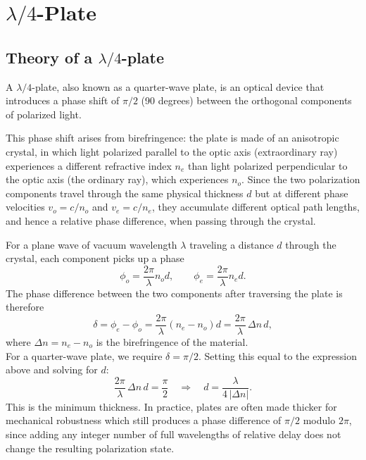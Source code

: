 \section{$\lambda/4$-Plate}

    \subsection{Theory of a $\lambda/4$-plate}
 A $\lambda/4$-plate, also known as a quarter-wave plate, is an optical device
that introduces a phase shift of $\pi/2$ (90 degrees) between the orthogonal
components of polarized light.

This phase shift arises from birefringence: the plate is made of an
anisotropic crystal, in which light polarized parallel to the optic
axis (extraordinary ray) experiences a different refractive index
$n_e$ than light polarized perpendicular to the optic axis (the
ordinary ray), which experiences $n_o$. Since the two polarization
components travel through the same physical thickness $d$ but at different
phase velocities $v_o = c/n_o$ and $v_e = c/n_e$, they accumulate different
optical path lengths, and hence a relative phase difference, when passing
through the crystal.

For a plane wave of vacuum wavelength $\lambda$ traveling a distance $d$
through the crystal, each component picks up a phase
\begin{equation}
    \phi_o = \frac{2\pi}{\lambda} n_o d, \qquad
    \phi_e = \frac{2\pi}{\lambda} n_e d.
\end{equation}
\noindent
The phase difference between the two components after traversing the plate
is therefore
\begin{equation}
    \delta = \phi_e - \phi_o
    = \frac{2\pi}{\lambda}\left(n_e - n_o\right) d
    = \frac{2\pi}{\lambda}\,\Delta n \, d,
\end{equation}
where $\Delta n = n_e - n_o$ is the birefringence of the material.\\
\noindent
For a quarter-wave plate, we require $\delta = \pi/2$. Setting this equal to the expression above and solving for
$d$:
\begin{equation}
    \frac{2\pi}{\lambda}\,\Delta n\, d = \frac{\pi}{2}
    \quad\Longrightarrow\quad
    d = \frac{\lambda}{4\,|\Delta n|}.
\end{equation}
\noindent
This is the minimum thickness. In practice, plates are often
made thicker for mechanical robustness
which still produces a phase difference of $\pi/2$ modulo $2\pi$, since
adding any integer number of full wavelengths of relative delay does not
change the resulting polarization state.

